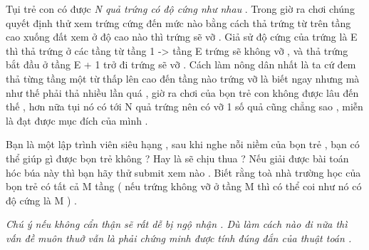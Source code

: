 Tụi trẻ con có được   \textit{    N quả trứng có độ cứng như nhau   }   . Trong giờ ra chơi chúng quyết định thử xem trứng cứng đến mức nào bằng cách thả trứng từ trên tầng cao xuống đất xem ở độ cao nào thì trứng sẽ vỡ . Giả sử độ cứng của trứng là E thì thả trứng ở các tầng từ tầng 1 -> tầng E trứng sẽ không vỡ , và thả trứng bắt đầu ở tầng E + 1 trở đi trứng sẽ vỡ . Cách làm nông dân nhất là ta cứ đem thả từng tầng một từ thấp lên cao đến tầng nào trứng vỡ là biết ngay nhưng mà như thế phải thả nhiều lần quá , giờ ra chơi của bọn trẻ con không được lâu đến thế , hơn nữa tụi nó có tới N quả trứng nên có vỡ 1 số quả cũng chẳng sao , miễn là đạt được mục đích của mình .   





   Bạn là một lập trình viên siêu hạng , sau khi nghe nỗi niềm của bọn trẻ , bạn có thể giúp gì được bọn trẻ không ? Hay là sẽ chịu thua ? Nếu giải được bài toán hóc búa này thì bạn hãy thử submit xem nào . Biết rằng toà nhà trường học của bọn trẻ có tất cả M tầng  ( nếu trứng không vỡ ở tầng M thì có thể coi như nó có độ cứng là M ) .   





\textit{         Chú ý nếu không cẩn thận sẽ rất dễ bị ngộ nhận . Dù làm cách nào đi nữa thì vấn đề muôn thuở vẫn là phải chứng minh được tính đúng đắn của thuật toán .       }